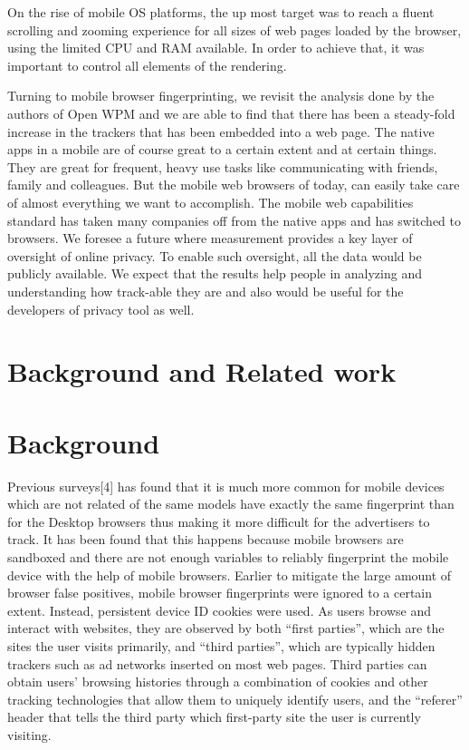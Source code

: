 \documentclass[journal]{IEEEtran}
\begin{document}
On the rise of mobile OS platforms, the up most target was to reach a fluent
scrolling and zooming experience for all sizes of web pages loaded by the
browser, using the limited CPU and RAM available. In order to achieve that, it
was important to control all elements of the rendering.


Turning to mobile browser fingerprinting, we revisit the analysis done by the
authors of Open WPM and we are able to find that there has been a steady-fold
increase in the trackers that has been embedded into a web page. The native apps
in a mobile are of course great to a certain extent and at certain things. They
are great for frequent, heavy use tasks like communicating with friends, family
and colleagues. But the mobile web browsers of today, can easily take care of
almost everything we want to accomplish. The mobile web capabilities standard
has taken many companies off from the native apps and has switched to browsers. 
We foresee a future where measurement provides a key layer of oversight of
online privacy. To enable such oversight, all the data would be publicly
available. We expect that the results help people in analyzing and
understanding how track-able they are and also would be useful for the developers of privacy tool as well.




\section{Background and Related work}
\section*{Background}
Previous surveys[4] has found that it is much more common for mobile devices
which are not related of the same models have exactly the same fingerprint than
for the Desktop browsers thus making it more difficult for the advertisers to
track. It has been found that this happens because mobile browsers are sandboxed
and there are not enough variables to reliably fingerprint the mobile
device with the help of mobile browsers. Earlier to mitigate the large amount of
browser false positives, mobile browser fingerprints were ignored to a certain
extent. Instead, persistent device ID cookies were used. As users browse and
interact with websites, they are observed by both “first parties”, which are the
sites the user visits primarily, and “third parties”, which are typically hidden
trackers such as ad networks inserted on most web pages. Third parties can
obtain users’ browsing histories through a combination of cookies and other
tracking technologies that allow them to uniquely identify users, and the
“referer” header that tells the third party which first-party site the user is
currently visiting.
\end{document}

